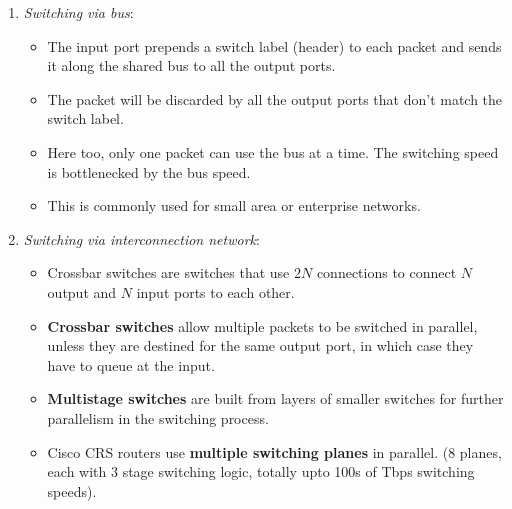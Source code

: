 \documentclass[a4paper]{article}
\theoremstyle{plain}
\theoremstyle{definition}
\begin{document}
\begin{itemize}
\begin{enumerate}
        \item \textit{Switching via bus}:
        \begin{itemize}
            \item The input port prepends a switch label (header) to each packet and sends it along the shared bus to all the output ports.
            
            \item The packet will be discarded by all the output ports that don't match the switch label. 
            
            \item Here too, only one packet can use the bus at a time. The switching speed is bottlenecked by the bus speed. 
            
            \item This is commonly used for small area or enterprise networks.
        \end{itemize}
        
        \item \textit{Switching via interconnection network}:
        \begin{itemize}
            \item Crossbar switches are switches that use $2N$ connections to connect $N$ output and $N$ input ports to each other. 
            
            \item \textbf{Crossbar switches} allow multiple packets to be switched in parallel, unless they are destined for the same output port, in which case they have to queue at the input. 
            
            \item \textbf{Multistage switches} are built from layers of smaller switches for further parallelism in the switching process. 
            
            \item Cisco CRS routers use \textbf{multiple switching planes} in parallel. (8 planes, each with 3 stage switching logic, totally upto 100s of Tbps switching speeds). 
        \end{itemize}
    \end{enumerate}
\end{itemize}
\end{document}
